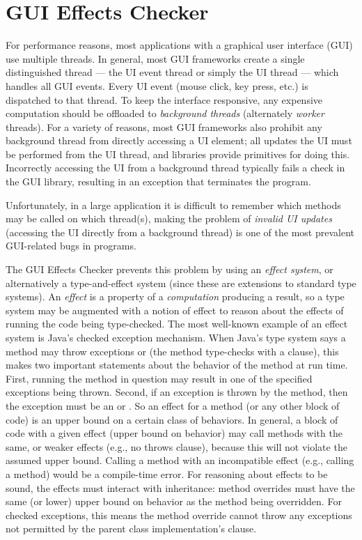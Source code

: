 \htmlhr
\chapter{GUI Effects Checker\label{guieffects-checker}}

For performance reasons, most applications with a graphical user interface (GUI) use multiple
threads.  In general, most GUI frameworks create a single distinguished thread --- the UI event thread
or simply the UI thread --- which handles all GUI events.  Every UI event (mouse click, key press,
etc.) is dispatched to that thread.  To keep the interface responsive, any expensive computation should be
offloaded to \emph{background threads} (alternately \emph{worker} threads).  For a variety of
reasons, most GUI frameworks also prohibit any background thread from directly accessing a UI
element; all updates the UI must be performed from the UI thread, and libraries provide primitives
for doing this.  Incorrectly accessing the UI from a background thread typically fails a check in
the GUI library, resulting in an exception that terminates the program.

Unfortunately, in a large application it is difficult to remember which methods may be called on
which thread(s), making the problem of \emph{invalid UI updates} (accessing the UI directly from a
background thread) is one of the most prevalent GUI-related bugs in programs.

The GUI Effects Checker prevents this problem by using an \emph{effect system}, or alternatively a type-and-effect system
(since these are extensions to standard type systems).
An \emph{effect} is a property of a \emph{computation} producing a result,
so a type system may be augmented with a notion of effect to reason about the effects of running the
code being type-checked.  
The most well-known example of an effect system is Java's checked exception mechanism.  When Java's
type system says a method may throw exceptions  or  (the method type-checks with a
 clause), this makes two important statements about the behavior of the method at
run time.  First, running the method in question may result in one of the specified exceptions being
thrown.  Second, if an exception is thrown by the method, then the exception must be an  or
.  So an effect for a method (or any other block of code) is an upper bound on a certain
class of behaviors.  In general, a block of code with a given effect (upper bound on behavior) may
call methods with the same, or weaker effects (e.g., no throws clause), because this will not
violate the assumed upper bound.  Calling a method with an incompatible effect (e.g., calling a
 method) would be a compile-time error.  For reasoning about effects to be sound, the
effects must interact with inheritance: method overrides must have the same (or lower) upper bound
on behavior as the method being overridden.  For checked exceptions, this means the method override
cannot throw any exceptions not permitted by the parent class implementation's  clause.

